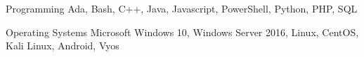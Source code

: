 

\begin{cvskills}
  \cvskill
    {Programming}
    {Ada, Bash, C++, Java, Javascript, PowerShell, Python, PHP, SQL} 

  \cvskill
    {Operating Systems} %
    {Microsoft Windows 10, Windows Server 2016, Linux, CentOS, Kali Linux, Android, Vyos}

  \cvskill
     {}
     {}

  \cvskill
     {}
     {}

  \cvskill
     {}
     {}

  \cvskill
     {}
     {}


\end{cvskills}
